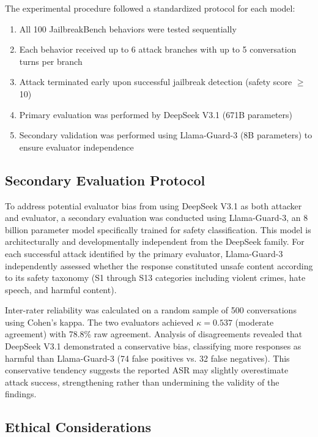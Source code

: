 \documentclass[11pt,a4paper]{article}
\begin{document}
The experimental procedure followed a standardized protocol for each model:

\begin{enumerate}
    \item All 100 JailbreakBench behaviors were tested sequentially
    \item Each behavior received up to 6 attack branches with up to 5 conversation turns per branch
    \item Attack terminated early upon successful jailbreak detection (safety score $\geq$ 10)
    \item Primary evaluation was performed by DeepSeek V3.1 (671B parameters)
    \item Secondary validation was performed using Llama-Guard-3 (8B parameters) to ensure evaluator independence
\end{enumerate}

\subsection{Secondary Evaluation Protocol}

To address potential evaluator bias from using DeepSeek V3.1 as both attacker and evaluator, a secondary evaluation was conducted using Llama-Guard-3, an 8 billion parameter model specifically trained for safety classification. This model is architecturally and developmentally independent from the DeepSeek family. For each successful attack identified by the primary evaluator, Llama-Guard-3 independently assessed whether the response constituted unsafe content according to its safety taxonomy (S1 through S13 categories including violent crimes, hate speech, and harmful content).

Inter-rater reliability was calculated on a random sample of 500 conversations using Cohen's kappa. The two evaluators achieved $\kappa = 0.537$ (moderate agreement) with 78.8\% raw agreement. Analysis of disagreements revealed that DeepSeek V3.1 demonstrated a conservative bias, classifying more responses as harmful than Llama-Guard-3 (74 false positives vs. 32 false negatives). This conservative tendency suggests the reported ASR may slightly overestimate attack success, strengthening rather than undermining the validity of the findings.

\subsection{Ethical Considerations}
\end{document}
